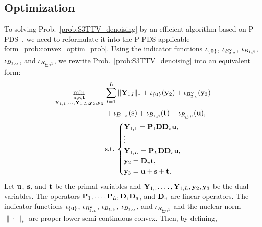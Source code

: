 \subsection{Optimization}
\label{subsec:Optim}
To solving Prob.~\eqref{prob:S3TTV_denoising} by an efficient algorithm based on P-PDS~\cite{Pock2011PPDS}, we need to reformulate it into the P-PDS applicable form~\eqref{prob:convex_optim_prob}. Using the indicator functions $\iota_{\{ \mathbf{0} \}}$, $\iota_{B_{2, \varepsilon}^{\mathbf{v}}}$, $\iota_{B_{1, \beta}}$, $\iota_{B_{1, \alpha}}$, and $\iota_{R_{\underline{\mu},\bar{\mu}}}$, we rewrite Prob.~\eqref{prob:S3TTV_denoising} into an equivalent form:
\begin{align}
	\label{prob:denoising2PPDS}
	\min_{
		\substack{
			\mathbf{u}, \mathbf{s}, \mathbf{t}\\ 
			\mathbf{Y}_{1,1}, \ldots , \mathbf{Y}_{1,L}, 
			\mathbf{y}_{2}, \mathbf{y}_{3}}} \:
	& \sum_{l=1}^{L} \| 
	\mathbf{Y}_{1, l} \|_{*}
	+ \iota_{\{ \mathbf{0} \}} (\mathbf{y}_{2})
	+ \iota_{B_{2, \varepsilon}^{\mathbf{v}}} (\mathbf{y}_{3}) \nonumber \\
	& + \iota_{B_{1, \alpha}} (\mathbf{s}) 
	+ \iota_{B_{1, \beta}} (\mathbf{t})
	+ \iota_{R_{\underline{\mu},\bar{\mu}}} (\mathbf{u}),  \nonumber \\
	& \mathrm{s.t.} \:
	\begin{cases} 
		\mathbf{Y}_{1,1} = \mathbf{P}_{1} \mathbf{D} \mathbf{D}_{s} \mathbf{u}, \\ 
		\vdots \\ 
		\mathbf{Y}_{1,L} = \mathbf{P}_{L} \mathbf{D} \mathbf{D}_{s} \mathbf{u}, \\ 
		\mathbf{y}_{2} = \mathbf{D}_{v} \mathbf{t}, \\
		\mathbf{y}_{3} = \mathbf{u} + \mathbf{s} + \mathbf{t}. 
	\end{cases}
\end{align}
Let $\mathbf{u}$, $\mathbf{s}$, and $\mathbf{t}$ be the primal variables and $\mathbf{Y}_{1,1}, \ldots , \mathbf{Y}_{1,L}, \mathbf{y}_{2}, \mathbf{y}_{3}$ be the dual variables. The operators $\mathbf{P}_{1}, \ldots, \mathbf{P}_{L}, \mathbf{D}, \mathbf{D}_{s}$, and $\mathbf{D}_{v}$ are linear operators. The indicator functions $\iota_{\{ \mathbf{0} \}}$, $\iota_{B_{2, \varepsilon}^{\mathbf{v}}}$, $\iota_{B_{1, \beta}}$, $\iota_{B_{1, \alpha}}$, and $\iota_{R_{\underline{\mu},\bar{\mu}}}$ and the nuclear norm $\| \cdot \|_{*}$ are proper lower semi-continuous convex. Then, by defining,
